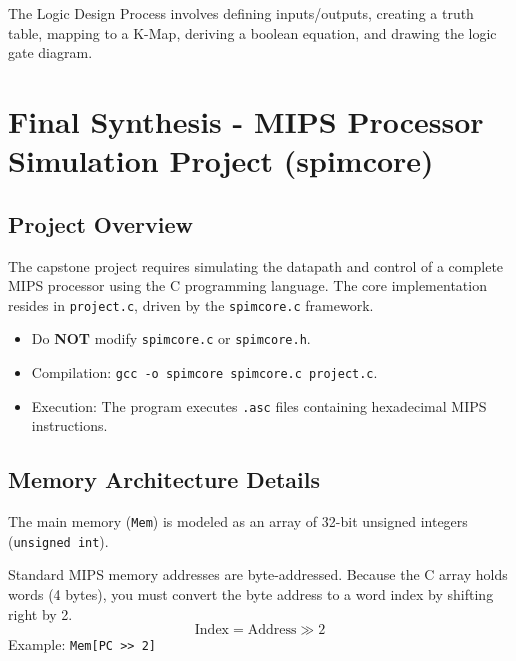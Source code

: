 \begin{remark}
The Logic Design Process involves defining inputs/outputs, creating a truth table, mapping to a K-Map, deriving a boolean equation, and drawing the logic gate diagram.
\end{remark}

\section{Final Synthesis - MIPS Processor Simulation Project (spimcore)}

\subsection{Project Overview}

\begin{remark}
The capstone project requires simulating the datapath and control of a complete MIPS processor using the C programming language. The core implementation resides in \texttt{project.c}, driven by the \texttt{spimcore.c} framework.
\end{remark}

\begin{itemize}
    \item Do \textbf{NOT} modify \texttt{spimcore.c} or \texttt{spimcore.h}.
    \item Compilation: \texttt{gcc -o spimcore spimcore.c project.c}.
    \item Execution: The program executes \texttt{.asc} files containing hexadecimal MIPS instructions.
\end{itemize}

\subsection{Memory Architecture Details}

\begin{vocabulary}
The main memory (\texttt{Mem}) is modeled as an array of 32-bit unsigned integers (\texttt{unsigned int}).
\end{vocabulary}

\begin{proposition}
Standard MIPS memory addresses are byte-addressed. Because the C array holds words (4 bytes), you must convert the byte address to a word index by shifting right by 2.
\begin{equation}
\text{Index} = \text{Address} \gg 2
\end{equation}
Example: \texttt{Mem[PC >> 2]}
\end{proposition}

